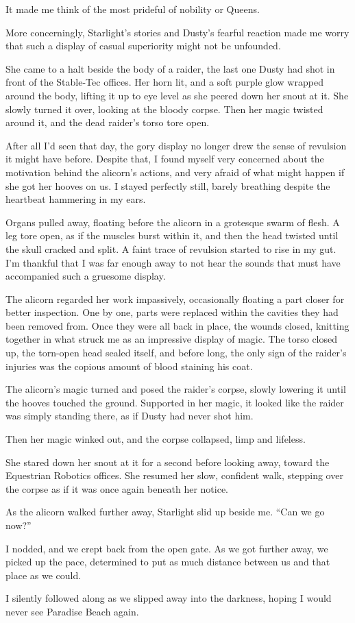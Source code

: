 It made me think of the most prideful of nobility or Queens.

More concerningly, Starlight’s stories and Dusty’s fearful reaction made me worry that such a display of casual superiority might not be unfounded.

She came to a halt beside the body of a raider, the last one Dusty had shot in front of the Stable-Tec offices. Her horn lit, and a soft purple glow wrapped around the body, lifting it up to eye level as she peered down her snout at it. She slowly turned it over, looking at the bloody corpse. Then her magic twisted around it, and the dead raider’s torso tore open.

After all I’d seen that day, the gory display no longer drew the sense of revulsion it might have before. Despite that, I found myself very concerned about the motivation behind the alicorn’s actions, and very afraid of what might happen if she got her hooves on us. I stayed perfectly still, barely breathing despite the heartbeat hammering in my ears.

Organs pulled away, floating before the alicorn in a grotesque swarm of flesh. A leg tore open, as if the muscles burst within it, and then the head twisted until the skull cracked and split. A faint trace of revulsion started to rise in my gut. I’m thankful that I was far enough away to not hear the sounds that must have accompanied such a gruesome display.

The alicorn regarded her work impassively, occasionally floating a part closer for better inspection. One by one, parts were replaced within the cavities they had been removed from. Once they were all back in place, the wounds closed, knitting together in what struck me as an impressive display of magic. The torso closed up, the torn-open head sealed itself, and before long, the only sign of the raider’s injuries was the copious amount of blood staining his coat.

The alicorn’s magic turned and posed the raider’s corpse, slowly lowering it until the hooves touched the ground. Supported in her magic, it looked like the raider was simply standing there, as if Dusty had never shot him.

Then her magic winked out, and the corpse collapsed, limp and lifeless.

She stared down her snout at it for a second before looking away, toward the Equestrian Robotics offices. She resumed her slow, confident walk, stepping over the corpse as if it was once again beneath her notice.

As the alicorn walked further away, Starlight slid up beside me. “Can we go now?”

I nodded, and we crept back from the open gate. As we got further away, we picked up the pace, determined to put as much distance between us and that place as we could.

I silently followed along as we slipped away into the darkness, hoping I would never see Paradise Beach again.